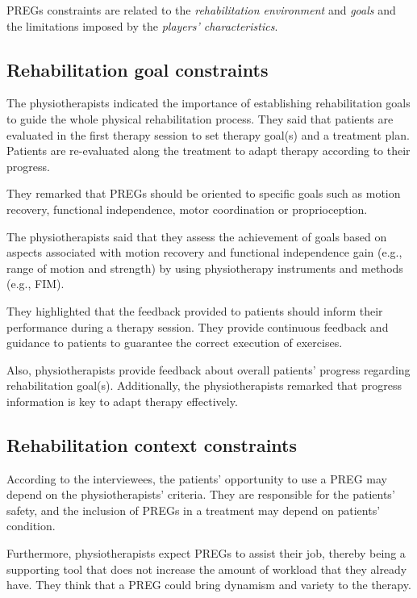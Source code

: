 \acp{PREG} constraints are related to the \textit{rehabilitation environment} and \textit{goals} and the limitations imposed by the \textit{players' characteristics}. 

\subsection{Rehabilitation goal constraints}
\label{sec:reh_goal_constraints}
The physiotherapists indicated the importance of establishing rehabilitation goals to guide the whole physical rehabilitation process. They said that patients are evaluated in the first therapy session to set therapy goal(s) and a treatment plan. Patients are re-evaluated along the treatment to adapt therapy according to their progress.

They remarked that \acp{PREG} should be oriented to specific goals such as motion recovery, functional independence, motor coordination or proprioception.

The physiotherapists said that they assess the achievement of goals based on aspects associated with motion recovery and functional independence gain (e.g., range of motion and strength) by using physiotherapy instruments and methods (e.g., \ac{FIM}).

They highlighted that the feedback provided to patients should inform their performance during a therapy session. They provide continuous feedback and guidance to patients to guarantee the correct execution of exercises.

Also, physiotherapists provide feedback about overall patients' progress regarding rehabilitation goal(s). Additionally, the physiotherapists remarked that progress information is key to adapt therapy effectively.

\subsection{Rehabilitation context constraints}
\label{sec:reh_context_constraints}
According to the interviewees, the patients' opportunity to use a \ac{PREG} may depend on the physiotherapists' criteria. They are responsible for the patients' safety, and the inclusion of \acp{PREG} in a treatment may depend on patients' condition.

Furthermore, physiotherapists expect \acp{PREG} to assist their job, thereby being a supporting tool that does not increase the amount of workload that they already have. They think that a \ac{PREG} could bring dynamism and variety to the therapy.

